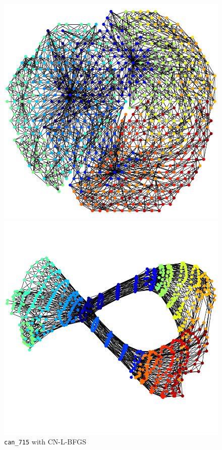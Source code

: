 \documentclass[dvipdfmx,10pt,journal,compsoc]{IEEEtran}
\begin{document}
\begin{figure}[t]
  \centering
  \begin{minipage}{0.49\columnwidth}
    \centering
    \includegraphics[width=\columnwidth]{circle/vis/can_715_CN-L-BFGS_50_first.png}
  \end{minipage}
  \begin{minipage}{0.49\columnwidth}
    \centering
    \includegraphics[width=\columnwidth]{circle/vis/can_715_CN-L-BFGS_50_last.png}
  \end{minipage}
  \caption{\texttt{can\_715} with \textsf{CN-L-BFGS}}
  \label{fig:can_715_CN}
\end{figure}
\end{document}
